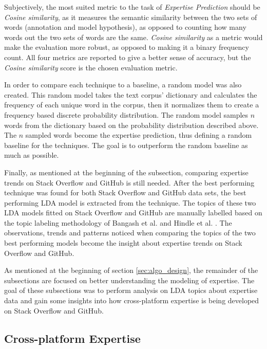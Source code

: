        Subjectively, the most suited metric to the task of \emph{Expertise Prediction} should be \emph{Cosine similarity}, as it measures the semantic similarity between the two sets of words (annotation and model hypothesis), as opposed to counting how many words out the two sets of words are the same. \emph{Cosine similarity} as a metric would make the evaluation more robust, as opposed to making it a binary frequency count. All four metrics are reported to give a better sense of accuracy, but the \emph{Cosine similarity} score is the chosen evaluation metric.
        
        In order to compare each technique to a baseline, a random model was also created. This random model takes the text corpus' dictionary and calculates the frequency of each unique word in the corpus, then it normalizes them to create a frequency based discrete probability distribution. The random model samples $n$ words from the dictionary based on the probability distribution described above. The $n$ sampled words become the expertise prediction, thus defining a random baseline for the techniques. The goal is to outperform the random baseline as much as possible.
        
        Finally, as mentioned at the beginning of the subsection, comparing expertise trends on Stack Overflow and GitHub is still needed. After the best performing technique was found for both Stack Overflow and GitHub data sets, the best performing LDA model is extracted from the technique. The topics of these two LDA models fitted on Stack Overflow and GitHub are manually labelled based on the topic labeling methodology of Bangash et al. \cite{bangash2019developers} and Hindle et al. \cite{hindle2012relating}. The observations, trends and patterns noticed when comparing the topics of the two best performing models become the insight about expertise trends on Stack Overflow and GitHub.
     
        As mentioned at the beginning of section \ref{sec:algo_design}, the remainder of the subsections are focused on better understanding the modeling of expertise. The goal of these subsections was to perform analysis on LDA topics about expertise data and gain some insights into how cross-platform expertise is being developed on Stack Overflow and GitHub.
    
    \subsection{Cross-platform Expertise\label{RQ2_task}}
    
